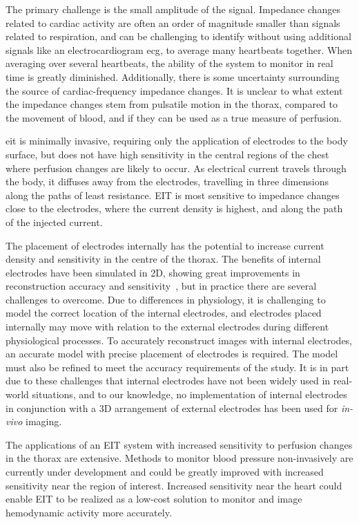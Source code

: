 The primary challenge is the small amplitude of the signal. 
Impedance changes related to cardiac activity are often an order of
magnitude smaller than signals related to respiration, 
and can be challenging to identify without using additional signals like 
an electrocardiogram \acrshort{ecg}, to average many heartbeats together. When 
averaging over several heartbeats, the ability of the system to 
monitor in real time is greatly diminished. Additionally,
there is some uncertainty surrounding the source of
cardiac-frequency impedance changes. It is unclear to what 
extent the impedance changes stem from pulsatile
motion in the thorax, compared to the movement of blood, 
and if they can be used as a true measure of perfusion. 

\acrshort{eit} is minimally invasive, requiring only 
the application of electrodes to the body surface, but 
does not have high sensitivity in the central regions 
of the chest where perfusion changes are likely to occur.
As electrical current travels through the body, it diffuses away from 
the electrodes,
travelling in three dimensions along the paths of least resistance. 
EIT is most sensitive to impedance changes close to the electrodes,
where the current density is highest, 
and along the path of the injected current.

The placement of electrodes internally has the 
potential to increase current density and sensitivity in 
the centre of the thorax. 
The benefits of internal electrodes have been simulated 
in 2D, showing great improvements in reconstruction accuracy 
and sensitivity~\parencite{nasehi_tehrani_modelling_2012}, but 
in practice there are several challenges to overcome. 
Due to differences in physiology, it is challenging to model
the correct location of the internal electrodes,
and electrodes placed internally may move with relation 
to the external electrodes during different physiological
processes.  
To accurately reconstruct images with internal electrodes, 
an accurate model with precise placement of electrodes is required.
The model must also be refined 
to meet the accuracy requirements of the study.  
It is in part due to these challenges that internal electrodes 
have not been widely used in real-world situations, and to our knowledge,
no implementation of internal electrodes in conjunction 
with a 3D arrangement of external electrodes has been used for \emph{in-vivo}
imaging.

The applications of an EIT system with increased sensitivity to perfusion changes
in the thorax are extensive. Methods to monitor blood pressure non-invasively are 
currently under development and could be greatly improved with increased sensitivity 
near the region of interest. Increased sensitivity near the heart 
could enable EIT to be realized as a low-cost solution to monitor and image
hemodynamic activity more accurately.  

